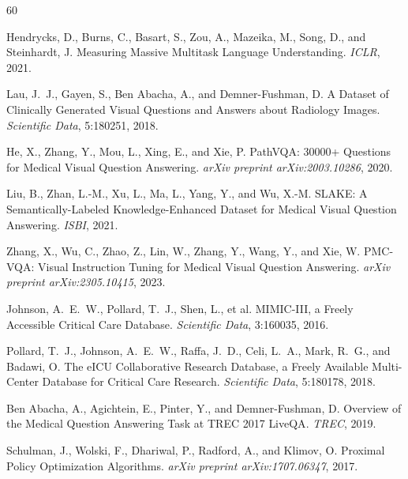 \documentclass{article}
\begin{document}
\begin{thebibliography}{60}

Hendrycks, D., Burns, C., Basart, S., Zou, A., Mazeika, M., Song, D., and Steinhardt, J.
\newblock Measuring Massive Multitask Language Understanding.
\newblock \emph{ICLR}, 2021.

Lau, J.~J., Gayen, S., {Ben Abacha}, A., and Demner-Fushman, D.
\newblock A Dataset of Clinically Generated Visual Questions and Answers about Radiology Images.
\newblock \emph{Scientific Data}, 5:180251, 2018.

He, X., Zhang, Y., Mou, L., Xing, E., and Xie, P.
\newblock PathVQA: 30000+ Questions for Medical Visual Question Answering.
\newblock \emph{arXiv preprint arXiv:2003.10286}, 2020.

Liu, B., Zhan, L.-M., Xu, L., Ma, L., Yang, Y., and Wu, X.-M.
\newblock SLAKE: A Semantically-Labeled Knowledge-Enhanced Dataset for Medical Visual Question Answering.
\newblock \emph{ISBI}, 2021.

Zhang, X., Wu, C., Zhao, Z., Lin, W., Zhang, Y., Wang, Y., and Xie, W.
\newblock PMC-VQA: Visual Instruction Tuning for Medical Visual Question Answering.
\newblock \emph{arXiv preprint arXiv:2305.10415}, 2023.

Johnson, A.~E.~W., Pollard, T.~J., Shen, L., et al.
\newblock MIMIC-III, a Freely Accessible Critical Care Database.
\newblock \emph{Scientific Data}, 3:160035, 2016.

Pollard, T.~J., Johnson, A.~E.~W., Raffa, J.~D., Celi, L.~A., Mark, R.~G., and Badawi, O.
\newblock The eICU Collaborative Research Database, a Freely Available Multi-Center Database for Critical Care Research.
\newblock \emph{Scientific Data}, 5:180178, 2018.

{Ben Abacha}, A., Agichtein, E., Pinter, Y., and Demner-Fushman, D.
\newblock Overview of the Medical Question Answering Task at {TREC} 2017 {LiveQA}.
\newblock \emph{TREC}, 2019.


Schulman, J., Wolski, F., Dhariwal, P., Radford, A., and Klimov, O.
\newblock Proximal Policy Optimization Algorithms.
\newblock \emph{arXiv preprint arXiv:1707.06347}, 2017.


\end{thebibliography}
\end{document}
